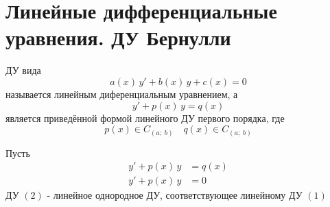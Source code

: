 \section{Линейные дифференциальные уравнения. ДУ Бернулли}

\begin{Def}[Линейное ДУ]
    ДУ вида 
    \[
        a(x)\,y' + b(x)\,y + c(x) = 0
    \] 
    называется линейным диференциальным уравнением, а\\
    \[
        y'+p(x)\,y=q(x)
    \]
    является приведённой формой линейного ДУ первого порядка, где
    \[
        p(x)\in C_{(a;\;b)} \quad q(x) \in C_{(a;\;b)}
    \]
\end{Def}

\begin{Def}
    Пусть 
    \begin{align}
        y'+p(x)\,y&=q(x)\\
        y'+p(x)\,y&=0
    \end{align}
    ДУ $(2)$ - линейное однородное ДУ, соответствующее линейному ДУ $(1)$\\
\end{Def}

